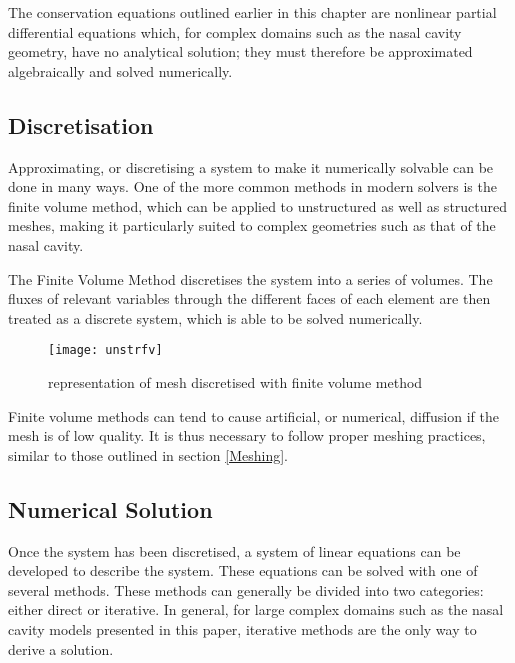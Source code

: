 The conservation equations outlined earlier in this chapter are nonlinear partial differential equations which, for complex domains such as the nasal cavity geometry, have no analytical solution; they must therefore be approximated algebraically and solved numerically.

\subsection{Discretisation}

Approximating, or discretising a system to make it numerically solvable can be done in many ways. One of the more common methods in modern solvers is the finite volume method, which can be applied to unstructured as well as structured meshes, making it particularly suited to complex geometries such as that of the nasal cavity.

The Finite Volume Method discretises the system into a series of volumes. The fluxes of relevant variables through the different faces of each element are then treated as a discrete system, which is able to be solved numerically.

\begin{figure}
  \texttt{[image: unstrfv]}
  \caption{representation of mesh discretised with finite volume method}
  \label{usfv}
\end{figure}

Finite volume methods can tend to cause artificial, or numerical, diffusion if the mesh is of low quality. It is thus necessary to follow proper meshing practices, similar to those outlined in section \ref{Meshing}.

\subsection{Numerical Solution}

Once the system has been discretised, a system of linear equations can be developed to describe the system. These equations can be solved with one of several methods. These methods can generally be divided into two categories: either direct or iterative. In general, for large complex domains such as the nasal cavity models presented in this paper, iterative methods are the only way to derive a solution.
